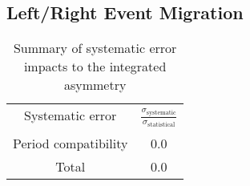 \subsection{Left/Right Event Migration}

\begin{table}[h!t]
  \centering
  \begin{tabular}{|c|c|}
    \hline
    Systematic error&
    \multirow{2}{4em}{$\frac{\sigma_{\mathrm{systematic}}}{\sigma_{\mathrm{statistical}}}$}\\
    & \\ \hline
    
    
    Period compatibility& 0.0\\ \hline

    Total& 0.0\\ \hline
    
  \end{tabular}
  \caption{Summary of systematic error impacts to the integrated asymmetry}
  \label{tab::sysError}
\end{table}
